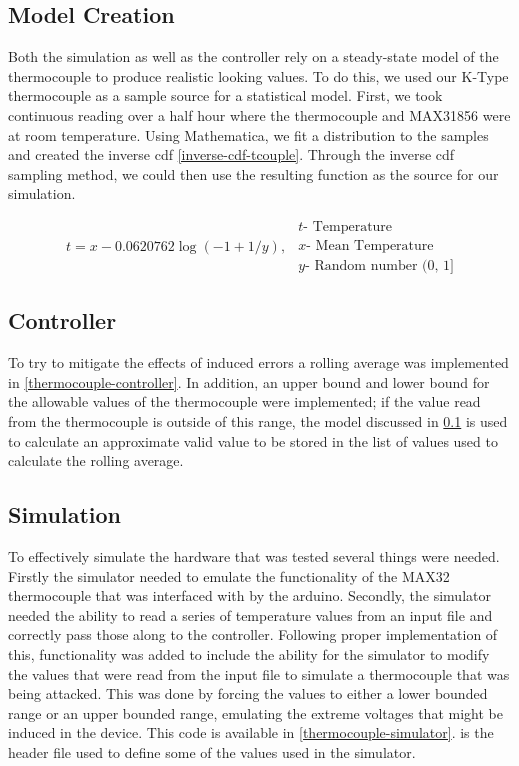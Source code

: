 \subsection{Model Creation}\label{model-creation}
Both the simulation as well as the controller rely on a steady-state model of the thermocouple to produce realistic looking values. To do this, we used our K-Type thermocouple as a sample source for a statistical model. First, we took continuous reading over a half hour where the thermocouple and MAX31856 were at room temperature. Using Mathematica, we fit a distribution to the samples and created the inverse \ac{cdf} \cref{inverse-cdf-tcouple}. Through the inverse \ac{cdf} sampling method, we could then use the resulting function as the source for our simulation. 

\begin{equation}\label{inverse-cdf-tcouple}
\begin{split}
t = x - 0.0620762 \log({-1 + 1/y}),
\end{split}
\begin{split}
t \text{- Temperature}\\
x \text{- Mean Temperature}\\
y \text{- Random number (0, 1]}
\end{split}
\end{equation}

\subsection{Controller}
To try to mitigate the effects of induced errors a rolling average was implemented in \cref{thermocouple-controller}. In addition, an upper bound and lower bound for the allowable values of the thermocouple were implemented; if the value read from the thermocouple is outside of this range, the model discussed in \cref{model-creation} is used to calculate an approximate valid value to be stored in the list of values used to calculate the rolling average.

\subsection{Simulation}
To effectively simulate the hardware that was tested several things were needed. Firstly the simulator needed to emulate the functionality of the MAX32 thermocouple that was interfaced with by the arduino. Secondly, the simulator needed the ability to read a series of temperature values from an input file and correctly pass those along to the controller. Following proper implementation of this, functionality was added to include the ability for the simulator to modify the values that were read from the input file to simulate a thermocouple that was being attacked. This was done by forcing the values to either a lower bounded range or an upper bounded range, emulating the extreme voltages that might be induced in the device. This code is available in \cref{thermocouple-simulator}.  is the header file used to define some of the values used in the simulator.

